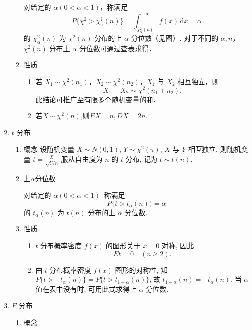 \begin{enumerate}
\begin{enumerate}
                        对给定的 $\alpha (0 < \alpha < 1)$，称满足
                        $$P\{\chi^{2} > \chi_{\alpha}^{2}(n)\} = \int_{\chi_{\alpha}^{2}(n)}^{+\infty} f(x) \, \mathrm{d}x = \alpha$$
                        的 $\chi_{\alpha}^{2}(n)$ 为 $\chi^{2}(n)$ 分布的上 $\alpha$ 分位数（见图）. 对于不同的 $\alpha, n$，$\chi^{2}(n)$ 分布上 $\alpha$ 分位数可通过查表求得．
                  \item 性质
                        \begin{enumerate}
                              \item  若 $X_{1} \sim \chi^{2}(n_{1})$，$X_{2} \sim \chi^{2}(n_{2})$，$X_{1}$ 与 $X_{2}$ 相互独立，则
                                    $$
                                          X_{1} + X_{2} \sim \chi^{2}(n_{1} + n_{2}).$$
                                    此结论可推广至有限多个随机变量的和．
                              \item $若X\sim\chi^{2}(n)$,则$EX=n,DX=2n.$
                        \end{enumerate}
            \end{enumerate}
      \item $t$ 分布
            \begin{enumerate}
                  \item 概念
                        设随机变量 $X \sim N(0,1)$, $Y \sim \chi^2(n)$, $X$ 与 $Y$ 相互独立, 则随机变量 $t = \frac{X}{\sqrt{Y/n}}$ 服从自由度为 $n$ 的 $t$ 分布, 记为 $t \sim t(n)$.
                  \item 上$\alpha$分位数

                        对给定的 $\alpha(0 < \alpha < 1)$, 称满足
                        $$P\{t > t_{\alpha}(n)\} = \alpha$$
                        的 $t_{\alpha}(n)$ 为 $t(n)$ 分布的上 $\alpha$ 分位数.
                  \item 性质
                        \begin{enumerate}
                              \item  $t$ 分布概率密度 $f(x)$ 的图形关于 $x = 0$ 对称, 因此
                                    $$Et = 0 \quad (n \geqslant 2).$$
                              \item 由 $t$ 分布概率密度 $f(x)$ 图形的对称性, 知 $P\{t > -t_{\alpha}(n)\} = P\{t > t_{1-\alpha}(n)\}$, 故 $t_{1-\alpha}(n) = -t_{\alpha}(n)$. 当 $\alpha$ 值在表中没有时, 可用此式求得上 $\alpha$ 分位数.
                        \end{enumerate}
            \end{enumerate}
      \item $F$ 分布
            \begin{enumerate}
                  \item 概念


\end{enumerate}
\end{enumerate}
